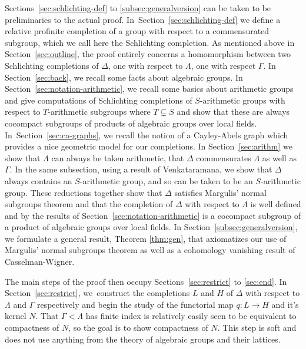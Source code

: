 \documentclass[11pt]{article}
\numberwithin{equation}{section}\providecommand{\llangle}{\langle\!\langle}\providecommand{\rrangle}{\rangle\!\rangle}\providecommand{\Asterisk}{\ast}
\theoremstyle{definition}
\begin{document}
Sections~\ref{sec:schlichting-def} to \ref{subsec:generalversion} can be taken to be preliminaries
to the actual proof. In~Section~\ref{sec:schlichting-def} we define a relative profinite completion of a group with respect to a commensurated subgroup, which we call here the Schlichting completion. As mentioned above in Section~\ref{sec:outline}, the proof entirely concerns
a homomorphism between two Schlichting completions of $\Delta$, one with respect to $\Lambda$,
one with respect $\Gamma$. In Section~\ref{sec:back}, we recall some
facts about algebraic groups. In Section~\ref{sec:notation-arithmetic}, we recall some basics about arithmetic groups and give computations of Schlichting completions of $S$-arithmetic groups with respect to $T$-arithmetic subgroups where $T \varsubsetneq S$ and show that these are always cocompact subgroups of
products of algebraic groups over local fields. In~Section~\ref{sec:ca-graphs}, we recall the notion of a Cayley-Abels graph which provides a nice geometric model for our completions. In Section~\ref{sec:arithm} we show that $\Lambda$ can always be taken arithmetic, that $\Delta$ commensurates $\Lambda$ as well as $\Gamma$. In the same subsection, using a result of Venkataramana, we show that $\Delta$ always contains an $S$-arithmetic group, and so can be taken to be an $S$-arithmetic group. These reductions together show that $\Delta$ satisfies Margulis' normal subgroups theorem and that the completion of $\Delta$ with respect
to $\Lambda$ is well defined and by the results of Section~\ref{sec:notation-arithmetic} is a
cocompact subgroup of a product of algebraic groups over local fields. In Section~\ref{subsec:generalversion}, we formulate a general result, Theorem \ref{thm:gen}, that axiomatizes our use of Margulis' normal subgroups theorem as well as a cohomology vanishing result of Casselman-Wigner.

The main steps of the proof then occupy Sections~\ref{sec:restrict} to \ref{sec:end}. In Section~\ref{sec:restrict}, we~construct the completions $L$ and $H$ of $\Delta$ with respect to
$\Lambda$ and $\Gamma$ respectively and begin the study of the functorial map $q:L \to H$ and it's kernel $N$. That $\Gamma < \Lambda$ has finite index is relatively easily seen to be equivalent to compactness of $N$, so the goal is to show compactness of $N$. This step is soft and does not use
anything from the theory of algebraic groups and their lattices.
\end{document}
